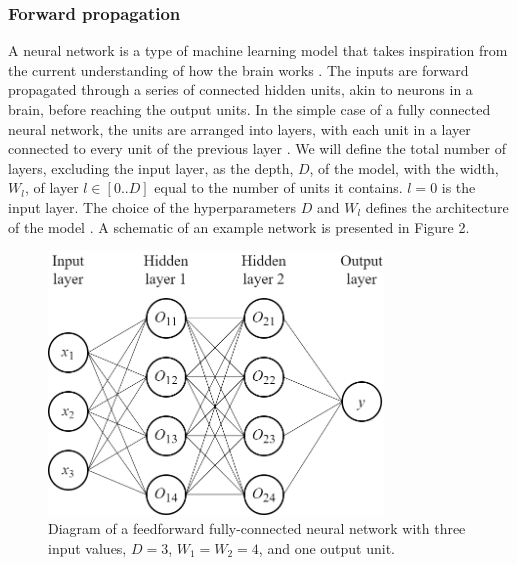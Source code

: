 \documentclass[12pt]{article}
\begin{document}
\subsubsection{Forward propagation}
A neural network is a type of machine learning model that takes inspiration from the current understanding of how the brain works \cite{Minsky69}. The inputs are forward propagated through a series of connected hidden units, akin to neurons in a brain, before reaching the output units. In the simple case of a fully connected neural network, the units are arranged into layers, with each unit in a layer connected to every unit of the previous layer \cite{Rumelhart86}. We will define the total number of layers, excluding the input layer, as the depth, $D$, of the model, with the width, $W_l$, of layer $l\in[0..D]$ equal to the number of units it contains. $l=0$ is the input layer. The choice of the hyperparameters $D$ and $W_l$ defines the architecture of the model \cite{Haykin98}. A schematic of an example network is presented in Figure 2. 

\begin{figure}[!htb]
\centering
\includegraphics[width=3.5in]{images/feedforward_nn.png}
\caption{Diagram of a feedforward fully-connected neural network with three input values, $D=3$, $W_1=W_2=4$, and one output unit.}
\end{figure}
\end{document}
